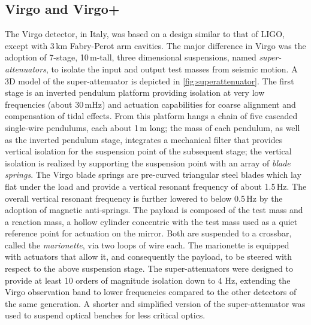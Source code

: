 \subsection{Virgo and Virgo+}\label{sec:Virgo}
The Virgo detector\cite{Accadia_2012}, in Italy, was based on a design similar to that of LIGO, except with 3\,km Fabry-Perot arm cavities. 
The major difference in Virgo was the adoption of 7-stage, 10\,m-tall, three dimensional suspensions, named \textit{super-attenuators}, to isolate the input and output test masses from seismic motion.
A 3D model of the super-attenuator is depicted in \autoref{fig:superattenuator}. The first stage is an inverted pendulum platform providing isolation at very low frequencies (about 30\,mHz) and actuation capabilities for coarse alignment and compensation of tidal effects.
From this platform hangs a chain of five cascaded single-wire pendulums, each about 1\,m long; the mass of each pendulum, as well as the inverted pendulum stage, integrates a mechanical filter that provides vertical isolation for the suspension point of the subsequent stage; the vertical isolation is realized by supporting the suspension point with an array of \textit{blade springs}.
The Virgo blade springs are pre-curved triangular steel blades which lay flat under the load and provide a vertical resonant frequency of about 1.5\,Hz.
The overall vertical resonant frequency is further lowered to below 0.5\,Hz by the adoption of magnetic anti-springs.
The payload is composed of the test mass and a reaction mass, a hollow cylinder concentric with the test mass used as a quiet reference point for actuation on the mirror. Both are suspended to a crossbar, called the \textit{marionette}, via two loops of wire each.
The marionette is equipped with actuators that allow it, and consequently the payload, to be steered with respect to the above suspension stage. 
The super-attenuators were designed to provide at least 10 orders of magnitude isolation down to 4 Hz, extending the Virgo observation band to lower frequencies compared to the other detectors of the same generation.
A shorter and simplified version of the super-attenuator was used to suspend optical benches for less critical optics.

